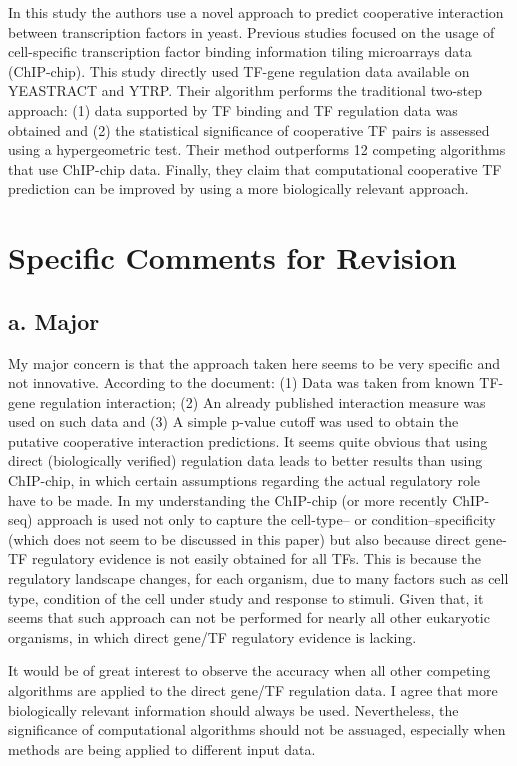 \documentclass[11pt]{article}
\begin{document}
In this study the authors use a novel approach to predict cooperative interaction between transcription factors in yeast. Previous studies focused on the usage of cell-specific transcription factor binding information tiling microarrays data (ChIP-chip). This study directly used TF-gene regulation data available on YEASTRACT and YTRP. Their algorithm performs the traditional two-step approach: (1) data supported by TF binding and TF regulation data was obtained and (2) the statistical significance of cooperative TF pairs is assessed using a hypergeometric test. Their method outperforms 12 competing algorithms that use ChIP-chip data. Finally, they claim that computational cooperative TF prediction can be improved by using a more biologically relevant approach.

\section{Specific Comments for Revision}

\subsection*{a. Major}

 My major concern is that the approach taken here seems to be very specific and not innovative. According to the document: (1) Data was taken from known TF-gene regulation interaction; (2) An already published interaction measure was used on such data and (3) A simple p-value cutoff was used to obtain the putative cooperative interaction predictions. It seems quite obvious that using direct (biologically verified) regulation data leads to better results than using ChIP-chip, in which certain assumptions regarding the actual regulatory role have to be made. In my understanding the ChIP-chip (or more recently ChIP-seq) approach is used not only to capture the cell-type-- or condition--specificity (which does not seem to be discussed in this paper) but also because direct gene-TF regulatory evidence is not easily obtained for all TFs. This is because the regulatory landscape changes, for each organism, due to many factors such as cell type, condition of the cell under study and response to stimuli. Given that, it seems that such approach can not be performed for nearly all other eukaryotic organisms, in which direct gene/TF regulatory evidence is lacking.

 It would be of great interest to observe the accuracy when all other competing algorithms are applied to the direct gene/TF regulation data. I agree that more biologically relevant information should always be used. Nevertheless, the significance of computational algorithms should not be assuaged, especially when methods are being applied to different input data.
\end{document}
